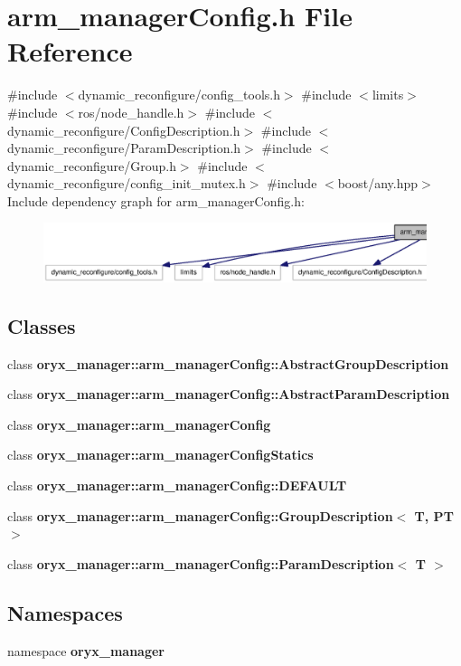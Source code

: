 \section{arm\-\_\-manager\-Config.\-h \-File \-Reference}
\label{arm__managerConfig_8h}
{\ttfamily \#include $<$dynamic\-\_\-reconfigure/config\-\_\-tools.\-h$>$}\*
{\ttfamily \#include $<$limits$>$}\*
{\ttfamily \#include $<$ros/node\-\_\-handle.\-h$>$}\*
{\ttfamily \#include $<$dynamic\-\_\-reconfigure/\-Config\-Description.\-h$>$}\*
{\ttfamily \#include $<$dynamic\-\_\-reconfigure/\-Param\-Description.\-h$>$}\*
{\ttfamily \#include $<$dynamic\-\_\-reconfigure/\-Group.\-h$>$}\*
{\ttfamily \#include $<$dynamic\-\_\-reconfigure/config\-\_\-init\-\_\-mutex.\-h$>$}\*
{\ttfamily \#include $<$boost/any.\-hpp$>$}\*
\-Include dependency graph for arm\-\_\-manager\-Config.\-h\-:
\nopagebreak
\begin{figure}[H]
\begin{center}
\leavevmode
\includegraphics[width=350pt]{arm__managerConfig_8h__incl}
\end{center}
\end{figure}
\subsection*{\-Classes}
\begin{DoxyCompactItemize}
\item 
class {\bf oryx\-\_\-manager\-::arm\-\_\-manager\-Config\-::\-Abstract\-Group\-Description}
\item 
class {\bf oryx\-\_\-manager\-::arm\-\_\-manager\-Config\-::\-Abstract\-Param\-Description}
\item 
class {\bf oryx\-\_\-manager\-::arm\-\_\-manager\-Config}
\item 
class {\bf oryx\-\_\-manager\-::arm\-\_\-manager\-Config\-Statics}
\item 
class {\bf oryx\-\_\-manager\-::arm\-\_\-manager\-Config\-::\-D\-E\-F\-A\-U\-L\-T}
\item 
class {\bf oryx\-\_\-manager\-::arm\-\_\-manager\-Config\-::\-Group\-Description$<$ T, P\-T $>$}
\item 
class {\bf oryx\-\_\-manager\-::arm\-\_\-manager\-Config\-::\-Param\-Description$<$ T $>$}
\end{DoxyCompactItemize}
\subsection*{\-Namespaces}
\begin{DoxyCompactItemize}
\item 
namespace {\bf oryx\-\_\-manager}
\end{DoxyCompactItemize}
